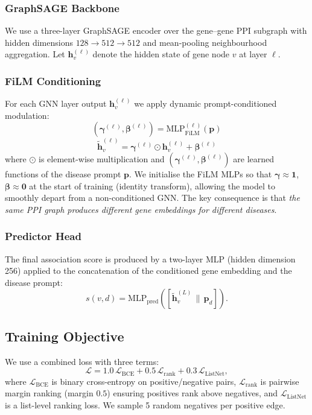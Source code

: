 \documentclass[conference]{IEEEtran}
\begin{document}
\subsubsection{GraphSAGE Backbone}
We use a three-layer GraphSAGE encoder over the gene--gene PPI subgraph with hidden dimensions $128 \rightarrow 512 \rightarrow 512$ and mean-pooling neighbourhood aggregation. Let $\bm{h}_v^{(\ell)}$ denote the hidden state of gene node $v$ at layer $\ell$.

\subsubsection{FiLM Conditioning}
For each GNN layer output $\bm{h}_v^{(\ell)}$ we apply dynamic prompt-conditioned modulation:
\begin{equation}
    (\bm{\gamma}^{(\ell)},\bm{\beta}^{(\ell)}) = \mathrm{MLP}_\mathrm{FiLM}^{(\ell)}(\bm{p})
\end{equation}
\begin{equation}
    \tilde{\bm{h}}_v^{(\ell)} = \bm{\gamma}^{(\ell)} \odot \bm{h}_v^{(\ell)} + \bm{\beta}^{(\ell)}
\end{equation}
where $\odot$ is element-wise multiplication and $(\bm{\gamma}^{(\ell)},\bm{\beta}^{(\ell)})$ are learned functions of the disease prompt $\bm{p}$. We initialise the FiLM MLPs so that $\bm{\gamma}\approx\mathbf{1}$, $\bm{\beta}\approx\mathbf{0}$ at the start of training (identity transform), allowing the model to smoothly depart from a non-conditioned GNN. The key consequence is that \emph{the same PPI graph produces different gene embeddings for different diseases}.

\subsubsection{Predictor Head}
The final association score is produced by a two-layer MLP (hidden dimension 256) applied to the concatenation of the conditioned gene embedding and the disease prompt:
\begin{equation}
    s(v, d) = \mathrm{MLP}_\mathrm{pred}\!\left(\left[\tilde{\bm{h}}_v^{(L)} \,\|\, \bm{p}_d\right]\right).
\end{equation}

\subsection{Training Objective}
We use a combined loss with three terms:
\begin{equation}
    \mathcal{L} = 1.0\,\mathcal{L}_\mathrm{BCE} + 0.5\,\mathcal{L}_\mathrm{rank} + 0.3\,\mathcal{L}_\mathrm{ListNet},
\end{equation}
where $\mathcal{L}_\mathrm{BCE}$ is binary cross-entropy on positive/negative pairs, $\mathcal{L}_\mathrm{rank}$ is pairwise margin ranking (margin $0.5$) ensuring positives rank above negatives, and $\mathcal{L}_\mathrm{ListNet}$ is a list-level ranking loss. We sample 5 random negatives per positive edge.
\end{document}
